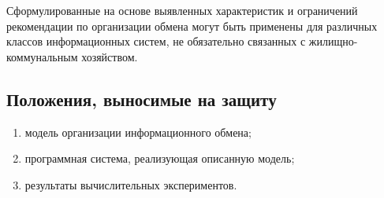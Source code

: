 Сформулированные на основе выявленных характеристик и ограничений рекомендации по организации обмена могут быть применены для различных классов информационных систем, не обязательно связанных с жилищно-коммунальным хозяйством.

\subsection*{Положения, выносимые на защиту}

\begin{enumerate}
	\item модель организации информационного обмена;
	\item программная система, реализующая описанную модель;
	\item результаты вычислительных экспериментов.
\end{enumerate}

\clearpage
\newpage